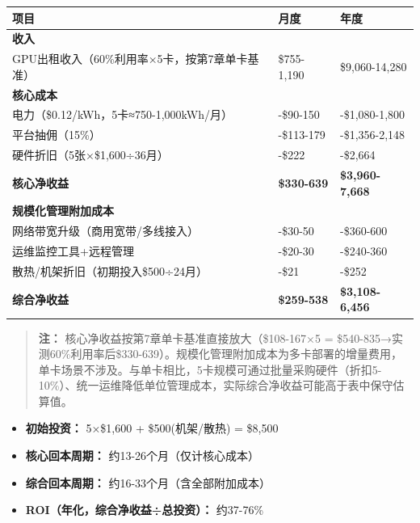 \documentclass[UTF8,a4paper,12pt]{ctexart}
\begin{document}
{\def\LTcaptype{none} %
\begin{longtable}[]{@{}
  >{\raggedright\arraybackslash}p{}
  >{\raggedright\arraybackslash}p{}
  >{\raggedright\arraybackslash}p{}@{}}
\toprule\noalign{}
\begin{minipage}[b]{\linewidth}\raggedright
项目
\end{minipage} & \begin{minipage}[b]{\linewidth}\raggedright
月度
\end{minipage} & \begin{minipage}[b]{\linewidth}\raggedright
年度
\end{minipage} \\
\midrule\noalign{}
\endhead
\bottomrule\noalign{}
\endlastfoot
\textbf{收入} & & \\
GPU出租收入（60\%利用率×5卡，按第7章单卡基准） & \$755-1,190 &
\$9,060-14,280 \\
\textbf{核心成本} & & \\
电力（\$0.12/kWh，5卡≈750-1,000kWh/月） & -\$90-150 & -\$1,080-1,800 \\
平台抽佣（15\%） & -\$113-179 & -\$1,356-2,148 \\
硬件折旧（5张×\$1,600÷36月） & -\$222 & -\$2,664 \\
\textbf{核心净收益} & \textbf{\$330-639} & \textbf{\$3,960-7,668} \\
\textbf{规模化管理附加成本} & & \\
网络带宽升级（商用宽带/多线接入） & -\$30-50 & -\$360-600 \\
运维监控工具+远程管理 & -\$20-30 & -\$240-360 \\
散热/机架折旧（初期投入\$500÷24月） & -\$21 & -\$252 \\
\textbf{综合净收益} & \textbf{\$259-538} & \textbf{\$3,108-6,456} \\
\end{longtable}
}

\begin{quote}
\textbf{注：} 核心净收益按第7章单卡基准直接放大（\$108-167×5 =
\$540-835→实测60\%利用率后\$330-639）。规模化管理附加成本为多卡部署的增量费用，单卡场景不涉及。与单卡相比，5卡规模可通过批量采购硬件（折扣5-10\%）、统一运维降低单位管理成本，实际综合净收益可能高于表中保守估算值。
\end{quote}

\begin{itemize}
\tightlist
\item
  \textbf{初始投资：} 5×\$1,600 + \$500(机架/散热) = \$8,500
\item
  \textbf{核心回本周期：} 约13-26个月（仅计核心成本）
\item
  \textbf{综合回本周期：} 约16-33个月（含全部附加成本）
\item
  \textbf{ROI（年化，综合净收益÷总投资）：} 约37-76\%
\end{itemize}
\end{document}
